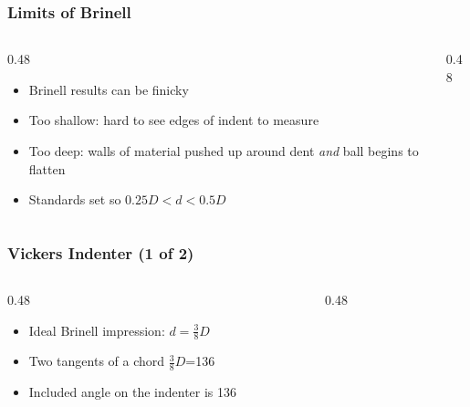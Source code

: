 \begin{frame}
	\frametitle{Limits of Brinell}
    \begin{columns}
        \begin{column}{0.48\linewidth}
            \begin{itemize}[<+- | alert@+>]
                \item Brinell results can be finicky
                \item Too shallow: hard to see edges of indent to measure
                \item Too deep: walls of material pushed up around dent \emph{and} ball begins to flatten
                \item Standards set so $0.25D<d<0.5D$
            \end{itemize}
        \end{column}
        \begin{column}{0.48\linewidth}
        \end{column}
    \end{columns}
\end{frame}

\begin{frame}
	\frametitle{Vickers Indenter (1 of 2)}

    \begin{columns}
        \begin{column}{0.48\linewidth}
            \begin{itemize}[<+- | alert@+>]
                \item Ideal Brinell impression: $d=\frac{3}{8}D$
                \item Two tangents of a chord $\frac{3}{8}D$=136\textdegree{}
                \item Included angle on the indenter is 136\textdegree{}
            \end{itemize}
        \end{column}
        \begin{column}{0.48\linewidth}
            \begin{figure}
                \centering
                \resizebox{\linewidth}{!}{
                    
                }
            \end{figure}
        \end{column}
    \end{columns}
\end{frame}

